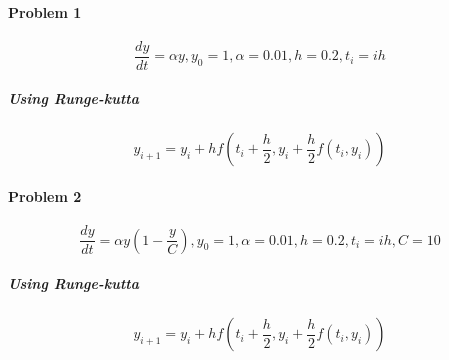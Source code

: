 \documentclass{article}
\begin{document}
\paragraph{Problem 1}
 \[
    \frac{dy}{dt} = \alpha y, y_{0} = 1, \alpha = 0.01, h=0.2, t_i = ih
 \]
 
 \subparagraph{Using Runge-kutta}
 \[
    y_{i+1} = y_i + hf(t_i+\frac{h}{2}, y_i + \frac{h}{2} f(t_i, y_i))
 \]
 
 \paragraph{Problem 2}
 \[
    \frac{dy}{dt} = \alpha y\left(1 - \frac{y}{C}\right) , y_{0} = 1, \alpha = 0.01, h = 0.2, t_i = ih, C = 10
 \]
 
 \subparagraph{Using Runge-kutta}
 \[
    y_{i+1} = y_i + hf(t_i+\frac{h}{2}, y_i + \frac{h}{2} f(t_i, y_i))
 \]
\end{document}
